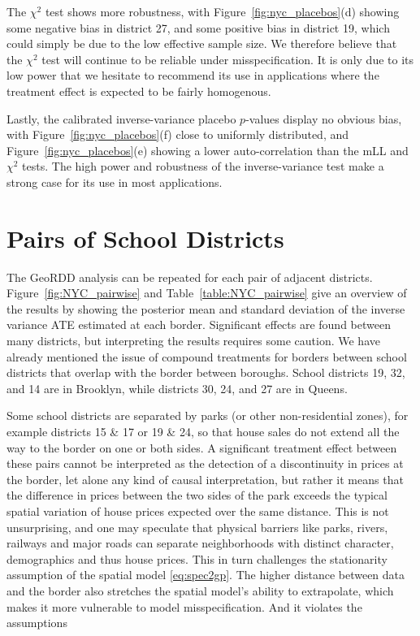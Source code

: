 \documentclass[letter]{article}
\begin{document}
The \(\chi^2\) test shows more robustness, with Figure~\ref{fig:nyc_placebos}(d) showing some negative bias in district 27, and some positive bias in district 19, which could simply be due to the low effective sample size.
We therefore believe that the \(\chi^2\) test will continue to be reliable under misspecification.
It is only due to its low power that we hesitate to recommend its use in applications where the treatment effect is expected to be fairly homogenous.

Lastly, the calibrated inverse-variance placebo \(p\)-values display no obvious bias, with Figure~\ref{fig:nyc_placebos}(f) close to uniformly distributed, and Figure~\ref{fig:nyc_placebos}(e) showing a lower auto-correlation than the mLL and \(\chi^2\) tests.
The high power and robustness of the inverse-variance test make a strong case for its use in most applications.
    


    	\hypertarget{pairs-of-school-districts}{%
\section{Pairs of School Districts}\label{pairs-of-school-districts}}
    


    	The GeoRDD analysis can be repeated for each pair of adjacent districts.
Figure~\ref{fig:NYC_pairwise} and Table~\ref{table:NYC_pairwise} give an overview of the results by showing the posterior mean and standard deviation of the inverse variance ATE estimated at each border.
Significant effects are found between many districts, but interpreting the results requires some caution.
We have already mentioned the issue of compound treatments for borders between school districts that overlap with the border between boroughs.
School districts 19, 32, and 14 are in Brooklyn, while districts 30, 24, and 27 are in Queens.
    


    	Some school districts are separated by parks (or other non-residential zones), for example districts 15 \& 17 or 19 \& 24, so that house sales do not extend all the way to the border on one or both sides.
A significant treatment effect between these pairs cannot be interpreted as the detection of a discontinuity in prices at the border, let alone any kind of causal interpretation, but rather it means that the difference in prices between the two sides of the park exceeds the typical spatial variation of house prices expected over the same distance.
This is not unsurprising, and one may speculate that physical barriers like parks, rivers, railways and major roads can separate neighborhoods with distinct character, demographics and thus house prices.
This in turn challenges the stationarity assumption of the spatial model \eqref{eq:spec2gp}.
The higher distance between data and the border also stretches the spatial model's ability to extrapolate, which makes it more vulnerable to model misspecification.
And it violates the assumptions
    
\end{document}
